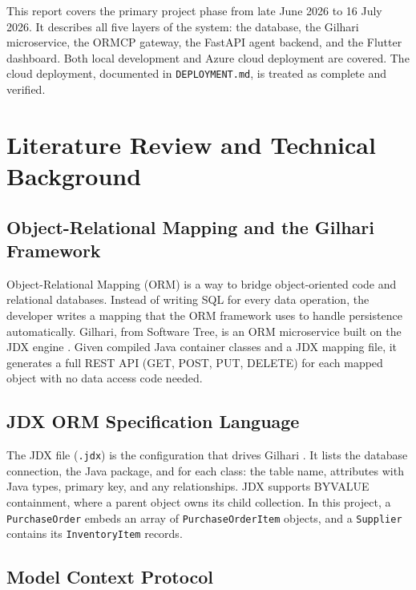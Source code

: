 \documentclass{book}
\begin{document}
This report covers the primary project phase from late June 2026 to 16 July 2026. It describes all five layers of the system: the database, the Gilhari microservice, the ORMCP gateway, the FastAPI agent backend, and the Flutter dashboard. Both local development and Azure cloud deployment are covered. The cloud deployment, documented in \texttt{DEPLOYMENT.md}, is treated as complete and verified.


\chapter{Literature Review and Technical Background}

\section{Object-Relational Mapping and the Gilhari Framework}

Object-Relational Mapping (ORM) is a way to bridge object-oriented code and relational databases. Instead of writing SQL for every data operation, the developer writes a mapping that the ORM framework uses to handle persistence automatically. Gilhari, from Software Tree, is an ORM microservice built on the JDX engine \cite{gilhari}. Given compiled Java container classes and a JDX mapping file, it generates a full REST API (GET, POST, PUT, DELETE) for each mapped object with no data access code needed.

\section{JDX ORM Specification Language}

The JDX file (\texttt{.jdx}) is the configuration that drives Gilhari \cite{jdx}. It lists the database connection, the Java package, and for each class: the table name, attributes with Java types, primary key, and any relationships. JDX supports BYVALUE containment, where a parent object owns its child collection. In this project, a \texttt{PurchaseOrder} embeds an array of \texttt{PurchaseOrderItem} objects, and a \texttt{Supplier} contains its \texttt{InventoryItem} records.

\section{Model Context Protocol}
\end{document}
